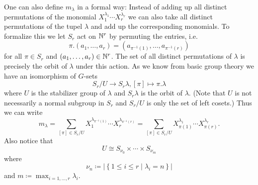 One can also define $m_\lambda$ in a formal way: Instead of adding up all distinct permutations of the monomial $X_1^{\lambda_1} \dotsm X_r^{\lambda_r}$ we can also take all distinct permutations of the tupel $\lambda$ and add up the corresponding monomials. To formalize this we let $S_r$ act on $\mathbb{N}^r$ by permuting the entries, i.e.
\[
 \pi.(a_1, \dotsc, a_r) = \left( a_{\pi^{-1}(1)}, \dotsc, a_{\pi^{-1}(r)} \right)
\]
for all $\pi \in S_r$ and $(a_1, \dotsc, a_r) \in \mathbb{N}^r$. The set of all distinct permutations of $\lambda$ is precisely the orbit of $\lambda$ under this action. As we know from basic group theory we have an isomorphism of $G$-sets
\[
 S_r / U \to S_r \lambda, [\pi] \mapsto \pi.\lambda
\]
where $U$ is the stabilizer group of $\lambda$ and $S_r \lambda$ is the orbit of $\lambda$. (Note that $U$ is not necessarily a normal subgroup in $S_r$ and $S_r/U$ is only the set of left cosets.) Thus we can write
\[
 m_\lambda
 = \sum_{[\pi] \in S_r/U} X_1^{\lambda_{\pi^{-1}(1)}} \dotsm X_r^{\lambda_{\pi^{-1}(r)}}
 = \sum_{[\pi] \in S_r/U} X_{\pi(1)}^{\lambda_1} \dotsm X_{\pi(r)}^{\lambda_r}.
\]
Also notice that
\[
 U \cong S_{\nu_0} \times \dotsb \times S_{\nu_m}
\]
where
\[
 \nu_n \coloneqq \left|\left\{ 1 \leq i \leq r \mid \lambda_i = n \right\}\right|
\]
and $m \coloneqq \max_{i=1,\dotsc,r} \lambda_i$.


